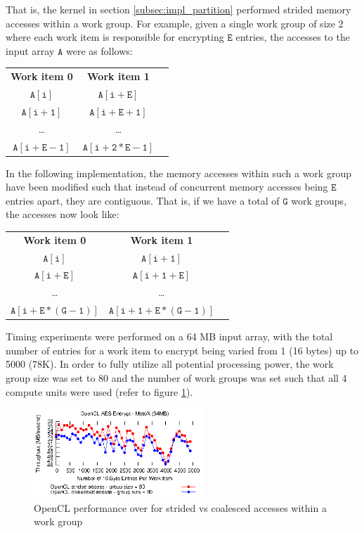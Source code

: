 \documentclass[conference,10pt]{IEEEtran}
\begin{document}
That is, the kernel in section \ref{subsec:impl_partition} performed strided memory accesses 
\cite{gpu_mem} within a work group.  For example, given a single work group of size 2 where each 
work item is responsible for encrypting $\mathtt{E}$ entries, the accesses to the input array 
$\mathtt{A}$ were as follows:

\begin{table}[h]
\centering
\begin{tabular}{ccc}
    \textbf{Work item 0} & \textbf{Work item 1} \\
    $\mathtt{A[i]}$         & $\mathtt{A[i + E]}$ \\
    $\mathtt{A[i + 1]}$     & $\mathtt{A[i + E + 1]}$ \\
    \ldots       & \ldots \\
    $\mathtt{A[i + E - 1]}$ & $\mathtt{A[i + 2*E - 1]}$ \\
\end{tabular}
\end{table}

In the following implementation, the memory accesses within such a work group have been modified 
such that instead of concurrent memory accesses being $\mathtt{E}$ entries apart, they are 
contiguous.  That is, if we have a total of $\mathtt{G}$ work groups, the accesses now look like:

\begin{table}[h]
\centering
\begin{tabular}{ccc}
    \textbf{Work item 0} & \textbf{Work item 1} \\
    $\mathtt{A[i]}$         & $\mathtt{A[i + 1]}$ \\
    $\mathtt{A[i + E]}$     & $\mathtt{A[i + 1 + E]}$ \\
    \ldots       & \ldots \\
    $\mathtt{A[i + E*(G - 1)]}$ & $\mathtt{A[i + 1 + E*(G - 1)]}$ \\
\end{tabular}
\end{table}

Timing experiments were performed on a 64 MB input array, with the total number of entries for a 
work item to encrypt being varied from 1 (16 bytes) up to 5000 (78K).  In order to fully utilize all 
potential processing power, the work group size was set to 80 and the number of work groups was set 
such that all 4 compute units were used (refer to figure \ref{fig:coalesce}).

\begin{figure}[!t]
\centering
\includegraphics[width=2.5in]{../final/motox/4.2/sample_opencl_aes_entries.64MB.4_work_groups.5000_max_entries.both.eps}
\caption{OpenCL performance over for strided vs coalesced accesses within a work group}
\label{fig:coalesce}
\end{figure}
\end{document}
